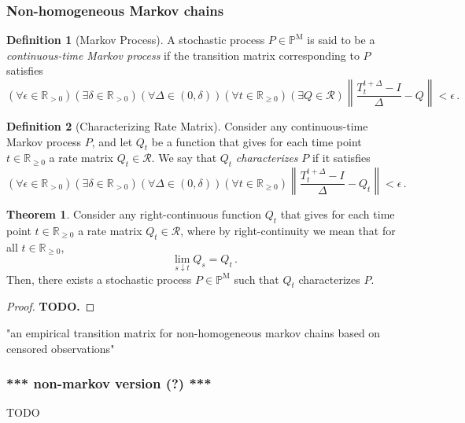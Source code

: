 \documentclass[10pt]{paper}
\theoremstyle{definition}
\newtheorem{theorem}{Theorem}
\newtheorem{definition}{Definition}
\newcommand{\reals}{\mathbb{R}}
\newcommand{\realspos}{\reals_{>0}}
\newcommand{\realsnonneg}{\reals_{\geq 0}}
\newcommand{\processes}{\mathbb{P}}
\newcommand{\mprocesses}{\processes^{\mathrm{M}}}
\newcommand{\norm}[1]{\left\lVert #1 \right\rVert}
\begin{document}
\subsubsection{Non-homogeneous Markov chains}


\begin{definition}[Markov Process]\label{def:markov_process}
A stochastic process $P\in\mprocesses$ is said to be a \emph{continuous-time Markov process} if the transition matrix corresponding to $P$ satisfies
\begin{equation*}
(\forall \epsilon\in\realspos)(\exists \delta\in\realspos)(\forall \Delta\in(0,\delta))(\forall t\in\realsnonneg)(\exists Q\in\mathcal{R}) \norm{\frac{T_t^{t+\Delta} - I}{\Delta} - Q} < \epsilon\,.
\end{equation*}
\end{definition}

\begin{definition}[Characterizing Rate Matrix]\label{def:markov_process_char_matrix}
Consider any continuous-time Markov process $P$, and let $Q_t$ be a function that gives for each time point $t\in\realsnonneg$ a rate matrix $Q_t\in\mathcal{R}$. We say that $Q_t$ \emph{characterizes} $P$ if it satisfies
\begin{equation*}
(\forall \epsilon\in\realspos)(\exists \delta\in\realspos)(\forall \Delta\in(0,\delta))(\forall t\in\realsnonneg)\norm{\frac{T_t^{t+\Delta} - I}{\Delta} - Q_t} < \epsilon\,.
\end{equation*}
\end{definition}

\begin{theorem}\label{theorem:continuous_rate_matrix_has_process}
Consider any right-continuous function $Q_t$ that gives for each time point $t\in\realsnonneg$ a rate matrix $Q_t\in\mathcal{R}$, where by right-continuity we mean that for all $t\in\realsnonneg$,
\begin{equation*}
\lim_{s\downarrow t} Q_s = Q_t\,.
\end{equation*}
Then, there exists a stochastic process $P\in\mprocesses$ such that $Q_t$ characterizes $P$.
\end{theorem}
\begin{proof}
{\bf TODO.}
\end{proof}


"an empirical transition matrix for non-homogeneous markov chains based on censored observations"



\subsubsection{*** non-markov version (?) ***}
TODO
\end{document}
